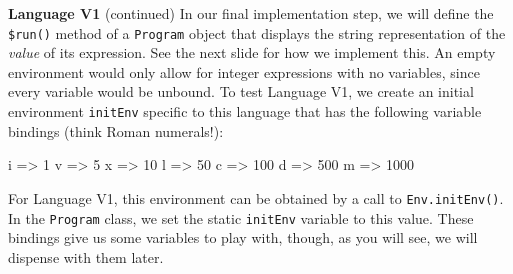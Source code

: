 \begin{minipage}[t]{\sw}
\slidenumber
\LARGE
{\bf Language V1} (continued)\exx
In our final implementation step,
we will define the \verb'$run()' method
of a \verb'Program' object that displays
the string representation of the {\em value} of its expression.
See the next slide for how we implement this.\exx
An empty environment would only allow for integer expressions
with no variables, since every variable would be unbound.
To test Language V1, we create an initial environment \verb'initEnv'
specific to this language that has the following variable bindings
(think Roman numerals!):
\begin{qv}
i => 1
v => 5
x => 10
l => 50
c => 100
d => 500
m => 1000
\end{qv}
For Language V1, this environment can be obtained
by a call to \verb'Env.initEnv()'.
In the \verb'Program' class, we set the static \verb'initEnv' 
variable to this value.
These bindings give us some variables to play with,
though, as you will see, we will dispense with them later.
\end{minipage}
\clearpage
